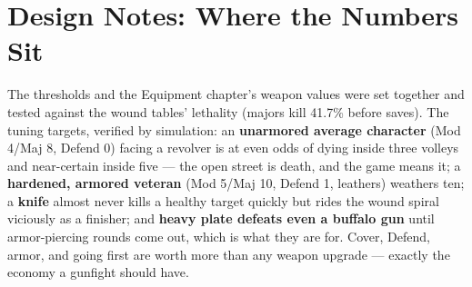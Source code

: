 \section{Design Notes: Where the Numbers Sit}

The thresholds and the Equipment chapter's weapon values were set together and tested against the wound tables' lethality (majors kill 41.7\% before saves). The tuning targets, verified by simulation: an \textbf{unarmored average character} (Mod 4/Maj 8, Defend 0) facing a revolver is at even odds of dying inside three volleys and near-certain inside five --- the open street is death, and the game means it; a \textbf{hardened, armored veteran} (Mod 5/Maj 10, Defend 1, leathers) weathers ten; a \textbf{knife} almost never kills a healthy target quickly but rides the wound spiral viciously as a finisher; and \textbf{heavy plate defeats even a buffalo gun} until armor-piercing rounds come out, which is what they are for. Cover, Defend, armor, and going first are worth more than any weapon upgrade --- exactly the economy a gunfight should have.
